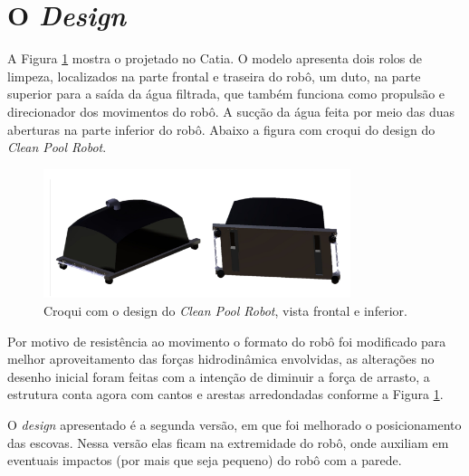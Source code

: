 \section{O \textit{Design}}
A Figura \ref{fig:croqui-design-cpr} mostra o \cpr projetado no \software Catia. O modelo apresenta dois rolos de limpeza, localizados na parte frontal e traseira do robô, um duto, na parte superior para a saída da água filtrada, que também funciona como propulsão e direcionador dos movimentos do robô. A sucção da água feita por meio das duas aberturas na parte inferior do robô. Abaixo a figura com croqui do design do \textit{Clean Pool Robot}.
\par
  \begin{figure}[h]
    \centering
    \includegraphics[width=0.8\textwidth]{figures/croqui-design-cpr.png}
    \caption{Croqui com o design do \textit{Clean Pool Robot}, vista frontal e inferior.}
    \label{fig:croqui-design-cpr}
  \end{figure}
  \FloatBarrier
\par
Por motivo de resistência ao movimento o formato do robô foi modificado para melhor aproveitamento das forças hidrodinâmica envolvidas, as alterações no desenho inicial foram feitas com a intenção de diminuir a força de arrasto, a estrutura conta agora com cantos e arestas arredondadas conforme a Figura \ref{fig:croqui-design-cpr}.

O \textit{design} apresentado é a segunda versão, em que foi melhorado o posicionamento das escovas. Nessa versão elas ficam na extremidade do robô, onde auxiliam em eventuais impactos (por mais que seja pequeno) do robô com a parede.

